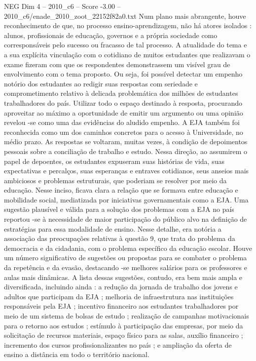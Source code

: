 \begin{textsample}{NEG Dim 4 – 2010\_c6 – Score -3.00 – 2010\_c6/enade\_2010\_zoot\_22152f82a0.txt}
Num plano mais abrangente, houve reconhecimento de que, no processo ensino-aprendizagem, não há atores isolados : alunos, profissionais de educação, governos e a própria sociedade como corresponsáveis pelo sucesso ou fracasso de tal processo.
A atualidade do tema e a sua explícita vinculação com o cotidiano de muitos estudantes que realizavam o exame fizeram com que os respondentes demonstrassem um visível grau de envolvimento com o tema proposto.
Ou seja, foi possível detectar um empenho notório dos estudantes ao redigir suas respostas com seriedade e comprometimento relativo à delicada problemática dos milhões de estudantes trabalhadores do país.
Utilizar todo o espaço destinado à resposta, procurando aproveitar ao máximo a oportunidade de emitir um argumento ou uma opinião revelou -se como uma das evidências do aludido empenho.
A EJA também foi reconhecida como um dos caminhos concretos para o acesso à Universidade, no médio prazo.
As respostas se voltaram, muitas vezes, à condição de depoimentos pessoais sobre a conciliação de trabalho e estudo.
Nessa direção, ao assumirem o papel de depoentes, os estudantes expuseram suas histórias de vida, suas expectativas e percalços, suas esperanças e entraves cotidianos, seus anseios mais ambiciosos e problemas estruturais, que poderiam se resolver por meio da educação.
Nesse inciso, ficava clara a relação que se formava entre educação e mobilidade social, mediatizada por iniciativas governamentais como a EJA.
Uma sugestão plausível e válida para a solução dos problemas com a EJA no país reportou -se à necessidade de maior participação do público alvo na definição de estratégias para essa modalidade de ensino.
Nesse detalhe, era notória a associação das preocupações relativas à questão 9, que trata do problema da democracia e da cidadania, com o problema específico da educação escolar.
Houve um número significativo de sugestões ou propostas para se combater o problema da repetência e da evasão, destacando -se melhores salários para os professores e aulas mais dinâmicas.
A lista dessas sugestões, contudo, era bem mais ampla e diversificada, incluindo ainda : a redução da jornada de trabalho dos jovens e adultos que participam da EJA ; melhoria de infraestrutura nas instituições responsáveis pela EJA ; incentivo financeiro aos estudantes trabalhadores por meio de um sistema de bolsas de estudo ; realização de campanhas motivacionais para o retorno aos estudos ; estímulo à participação das empresas, por meio da solicitação de recursos materiais, espaço físico para as salas, auxílio financeiro ; incremento dos cursos profissionalizantes no país ; e ampliação da oferta de ensino a distância em todo o território nacional.

\end{textsample}

